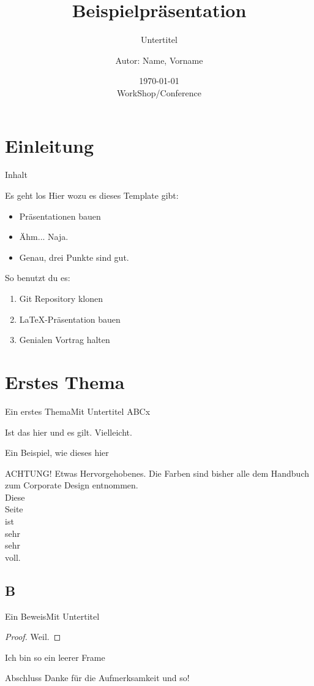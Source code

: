 \documentclass[german,10pt,xcolor=colortbl,compress,aspectratio=169
]{beamer}
\title{Beispielpräsentation}
\subtitle{Untertitel}
\date[]{\today\\[1ex] WorkShop/Conference}
\author[Autor in Fußzeile]{Autor: Name, Vorname}
\institute[]{AG xy\\FB ab\\RPTU in Kaiserslautern}
\begin{document}
\maketitle
\section{Einleitung}
\begin{frame}{Inhalt}
	\tableofcontents
\end{frame}
\begin{frame}{Es geht los}
	Hier wozu es dieses Template gibt:
	\begin{itemize}
		\item Präsentationen bauen
		\item Ähm... Naja.
		\item Genau, drei Punkte sind gut.
	\end{itemize}
	So benutzt du es:
	\begin{enumerate}
		\item Git Repository klonen
		\item \LaTeX-Präsentation bauen
		\item Genialen Vortrag halten
	\end{enumerate}
\end{frame}
\section{Erstes Thema}
\begin{frame}{Ein erstes Thema}{Mit Untertitel}
	ABCx
	\begin{lemma}
		Ist das hier und es gilt. Vielleicht.
	\end{lemma}
	\begin{example}
		Ein Beispiel, wie dieses hier
	\end{example}
	\alert{ACHTUNG!}
	Etwas Hervorgehobenes. Die Farben sind bisher alle dem Handbuch zum Corporate Design entnommen.\\
	Diese\\
	Seite\\
	ist\\
	sehr\\
	sehr\\
	voll.
\end{frame}
\subsection{B}
\begin{frame}{Ein Beweis}{Mit Untertitel}
	\begin{proof}
		Weil.
	\end{proof}
\end{frame}
\begin{frame}[plain]{}{}%
	Ich bin so ein leerer Frame
\end{frame}
\begin{frame}{Abschluss}
	Danke für die Aufmerksamkeit und so!
\end{frame}
\end{document}
